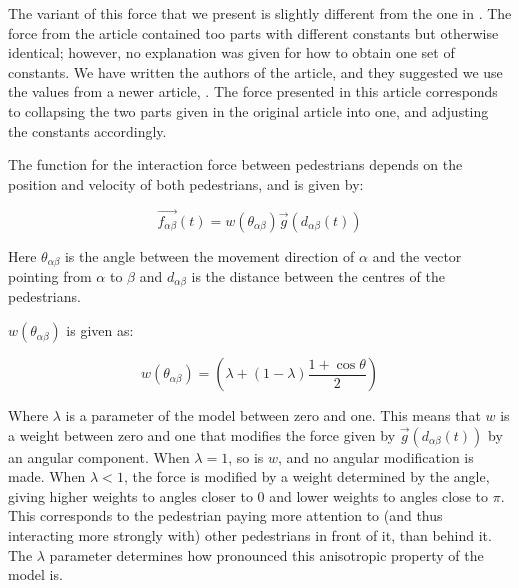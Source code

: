 The variant of this force that we present is slightly different from the one 
in \cite{self-org}.  The force from the article contained too parts with 
different constants but otherwise identical; however, no explanation was given 
for how to obtain one set of constants. We have written the authors of the 
article, and they suggested we use the values from a newer article, 
\cite{ABconstant}. The force presented in this article corresponds to 
collapsing the two parts given in the original article into one, and adjusting 
the constants accordingly.

The function for the interaction force between pedestrians depends on the 
position and velocity of both pedestrians, and is given by:

\begin{equation}
    \overrightarrow{f_{\alpha \beta }}(t) = 
    w\left(\theta_{\alpha \beta}\right)
    \overrightarrow{g}\left(d_{\alpha \beta}(t)\right)
    \label{eq:pedestrianinteraction}
\end{equation}

Here $\theta_{\alpha \beta}$ is the angle between the movement direction of 
$\alpha$ and the vector pointing from $\alpha$ to $\beta$ and $d_{\alpha 
\beta}$ is the distance between the centres of the pedestrians. 

$ w(\theta_{\alpha \beta})$ is given as: 

\begin{equation}
    w\left(\theta_{\alpha \beta}\right)=
    \left(
        \lambda + \left(
            1 - \lambda
        \right)
		\frac{1+\cos{\theta}}{2}
    \right) 
    \label{angleAB}
\end{equation}

Where $\lambda$ is a parameter of the model between zero and one. This means 
that $w$ is a weight between zero and one that modifies the force given by 
$\overrightarrow{g}\left(d_{\alpha \beta}(t)\right)$ by an angular component.  
When $\lambda=1$, so is $w$, and no angular modification is made. When 
$\lambda<1$, the force is modified by a weight determined by the angle, giving 
higher weights to angles closer to $0$ and lower weights to angles close to 
$\pi$. This corresponds to the pedestrian paying more attention to (and thus 
interacting more strongly with) other pedestrians in front of it, than behind 
it. The $\lambda$ parameter determines how pronounced this anisotropic 
property of the model is.


